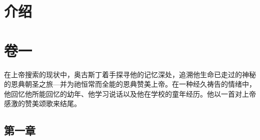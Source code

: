 \documentclass[12pt, a4paper, oneside]{ctexart}
\begin{document}
\newpage
{}
\setcounter{page}{1}
\tableofcontents
\newpage
\setcounter{page}{1}

\section*{介绍}


\newpage

\section{卷一}

在上帝搜索的现状中，奥古斯丁着手探寻他的记忆深处，追溯他生命已走过的神秘的恩典朝圣之旅---并为祂恒常而全能的恩典赞美上帝。在一种经久祷告的情绪中，他回忆他所能回忆的幼年、他学习说话以及他在学校的童年经历。他以一首对上帝感激的赞美颂歌来结尾。

\subsection{第一章}
\end{document}
